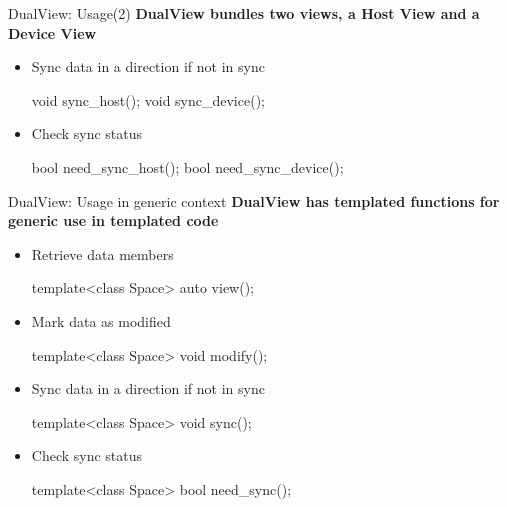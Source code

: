 \begin{frame}[fragile]{DualView: Usage(2)}
\vspace{1em}
  \textbf{DualView bundles two views, a Host View and a Device View}
  \begin{itemize}
    \item{Sync data in a direction if not in sync}
      \begin{code}[frame=single, keywords={}]
          void sync_host();
          void sync_device();
      \end{code}
    \item{Check sync status}
      \begin{code}[frame=single, keywords={}]
          bool need_sync_host();
          bool need_sync_device();
      \end{code}
   \end{itemize}
\end{frame}

\begin{frame}[fragile]{DualView: Usage in generic context}
\textbf{DualView has templated functions for generic use in templated code}

  \begin{itemize}
    \item{Retrieve data members}
      \begin{code}[frame=single, keywords={}]
          template<class Space>
          auto view();
      \end{code}
\vspace{-0.2em}
    \item{Mark data as modified}
      \begin{code}[frame=single, keywords={}]
          template<class Space>
          void modify();
      \end{code}
\vspace{-0.2em}
    \item{Sync data in a direction if not in sync}
      \begin{code}[frame=single, keywords={}]
          template<class Space>
          void sync();
      \end{code}
\vspace{-0.2em}
    \item{Check sync status}
      \begin{code}[frame=single, keywords={}]
          template<class Space>
          bool need_sync();
      \end{code}
   \end{itemize}   
\end{frame}

